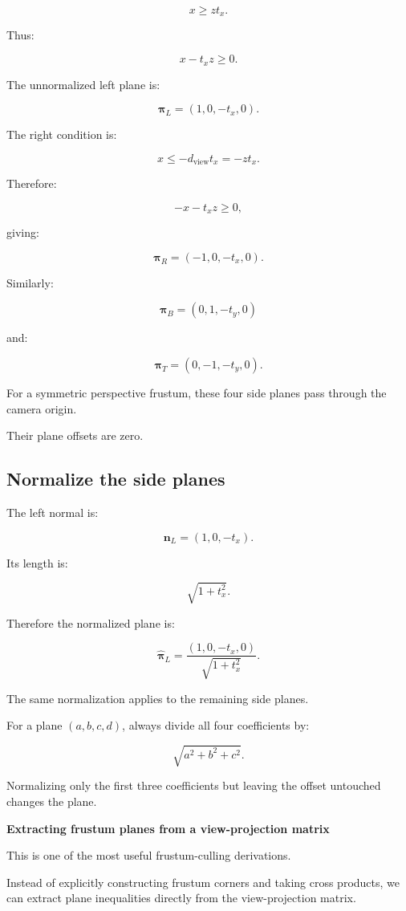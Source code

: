 \[
 x\ge zt_x.
\]

Thus:

\[
 \boxed{x-t_xz\ge0}.
\]

The unnormalized left plane is:

\[
 \boxed{ \boldsymbol\pi_L=(1,0,-t_x,0) }.
\]

The right condition is:

\[
 x\le-d_{\mathrm{view}}t_x=-zt_x.
\]

Therefore:

\[
 \boxed{-x-t_xz\ge0},
\]

giving:

\[
 \boxed{ \boldsymbol\pi_R=(-1,0,-t_x,0) }.
\]

Similarly:

\[
 \boxed{ \boldsymbol\pi_B=(0,1,-t_y,0) }
\]

and:

\[
 \boxed{ \boldsymbol\pi_T=(0,-1,-t_y,0) }.
\]

For a symmetric perspective frustum, these four side planes pass through the camera origin.

Their plane offsets are zero.

\subsection{Normalize the side planes}\label{02-foundations-ii-ch034-normalize-the-side-planes}

The left normal is:

\[
 \mathbf n_L=(1,0,-t_x).
\]

Its length is:

\[
 \sqrt{1+t_x^2}.
\]

Therefore the normalized plane is:

\[
 \boxed{ \hat{\boldsymbol\pi}_L= \frac{(1,0,-t_x,0)} {\sqrt{1+t_x^2}} }.
\]

The same normalization applies to the remaining side planes.

For a plane \((a,b,c,d)\), always divide all four coefficients by:

\[
 \sqrt{a^2+b^2+c^2}.
\]

Normalizing only the first three coefficients but leaving the offset untouched changes the plane.

\textbf{Extracting frustum planes from a view-projection matrix}

This is one of the most useful frustum-culling derivations.

Instead of explicitly constructing frustum corners and taking cross products, we can extract plane inequalities directly from the view-projection matrix.

